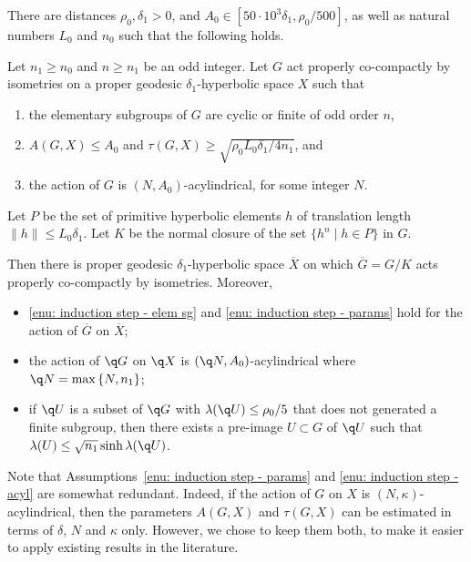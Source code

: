 \begin{prop}\label{P: induction step}
There are distances $\rho_0,\delta_1> 0$, and $A_0 \in [50 \cdot 10^3\delta_1, \rho_0/500]$, as well as natural numbers $L_0$ and $n_0$ such that the following holds.

Let $n_1 \geq n_0$ and $n \geq n_1$ be an odd integer.
Let $G$ act properly co-compactly by isometries on a proper geodesic $\delta_1$-hyperbolic space $X$ such that
\begin{enumerate}
\item \label{enu: induction step - elem sg}
the elementary subgroups of $G$ are cyclic or finite of odd order $n$,
\item \label{enu: induction step - params}
$A(G,X)\leqslant A_0$ and $\tau(G,X)\geqslant \sqrt{\rho_0 L_0 \delta_1/4n_1}$, and
\item \label{enu: induction step - acyl}
the action of $G$ is $(N,A_0)$-acylindrical, for some integer $N$.
\end{enumerate}
Let $P$ be the set of primitive hyperbolic elements $h$ of translation length $\|h\|\leqslant L_0 \delta_1$. Let $K$ be the normal closure of the set $\{h^n\mid h\in P\}$ in $G$.

Then there is proper geodesic $\delta_1$-hyperbolic space $\overline{X}$ on which $\overline{G}=G/K$ acts properly co-compactly by isometries. Moreover,
\begin{itemize}
\item \eqref{enu: induction step - elem sg} and \eqref{enu: induction step - params} hold for the action of $\overline{G}$ on $\overline{X}$;
\item the action of $\q G$ on $\q X$ is $(\q N, A_0)$-acylindrical where $\q N = \max\left\{N, n_1\right\}$;
\item if $\q U$ is a subset of $\q G$ with $\lambda(\q U) \leq \rho_0/5$ that does not generated a finite subgroup, then there exists a pre-image $U \subset G$ of $\q U$ such that $\lambda(U) \leq \sqrt{n_1} \sinh \lambda(\q U)$.
\end{itemize}
\end{prop}

\begin{rem}
Note that Assumptions~\eqref{enu: induction step - params} and \eqref{enu: induction step - acyl} are somewhat redundant.
Indeed, if the action of $G$ on $X$ is $(N,\kappa)$-acylindrical, then the parameters $A(G,X)$ and $\tau(G,X)$ can be estimated in terms of $\delta$, $N$ and $\kappa$ only.
However, we chose to keep them both, to make it easier to apply existing results in the literature.
\end{rem}


